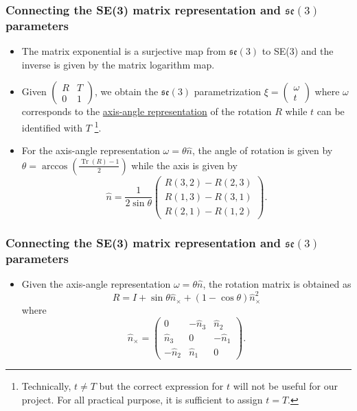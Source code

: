\documentclass{beamer}
\DeclareMathOperator{\Tr}{Tr}
\begin{document}
\begin{frame} [label=SEtose]
\frametitle{Connecting the SE(3) matrix representation and $\mathfrak{se}(3)$ parameters}
\begin{itemize}
\justifying
\item The matrix exponential is a surjective map from $\mathfrak{se}(3)$ to SE(3) and the inverse is given by the matrix logarithm map.
\item Given $\left(\begin{matrix} R & T \\ 0 & 1 \end{matrix}\right)$, we obtain the $\mathfrak{se}(3)$ parametrization $\xi=\left(\begin{matrix} \omega \\ t \end{matrix}\right)$ where $\omega$ corresponds to the \href{https://en.wikipedia.org/wiki/Axis-angle_representation}{\alert{axis-angle representation}} of the rotation $R$ while $t$ can be identified with $T$ \footnote{Technically, $t\neq T$ but the correct expression for $t$ will not be useful for our project. For all practical purpose, it is sufficient to assign $t=T$.}.
\item For the axis-angle representation $\omega =\theta\hat{n}$, the angle of rotation is given by $\theta=\arccos\left(\frac{\Tr(R)-1}{2}\right)$ while the axis is given by
$$\hat{n}=\frac{1}{2\sin\theta}\left(\begin{matrix} R(3,2)- R(2,3) \\ R(1,3) -R(3,1) \\ R(2,1) - R(1,2) \end{matrix}\right).$$
\end{itemize}
\end{frame}

\begin{frame} [label=omegatoR]
\frametitle{Connecting the SE(3) matrix representation and $\mathfrak{se}(3)$ parameters}
\begin{itemize}
\justifying
\item Given the axis-angle representation $\omega =\theta\hat{n}$, the rotation matrix is obtained as $$R=I+\sin\theta\hat{n}_{\times}+(1-\cos\theta)\hat{n}_{\times}^2$$ where
$$\hat{n}_{\times}=\left(\begin{matrix}0 & -\hat{n}_3 & \hat{n}_2 \\ \hat{n}_3 & 0 & -\hat{n}_1 \\ -\hat{n}_2 & \hat{n}_1 & 0\end{matrix}\right).$$
\end{itemize}
\end{frame}
\end{document}
